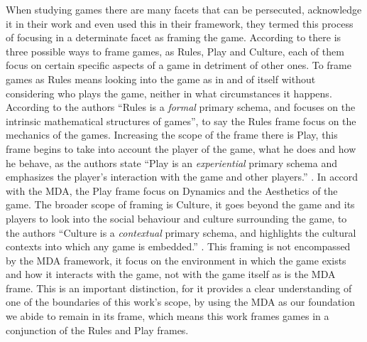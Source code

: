 When studying games there are many facets that can be persecuted, \cite{salen2004rules} acknowledge it in their work and even used this in their framework, they termed this process of focusing in a determinate facet as framing the game. According to \cite{salen2004rules} there is three possible ways to frame games, as Rules, Play and Culture, each of them focus on certain specific aspects of a game in detriment of other ones. To frame games as Rules means looking into the game as in and of itself without considering who plays the game, neither in what circumstances it happens. According to the authors ``Rules is a \textit{formal} primary schema, and focuses on the intrinsic mathematical structures of games''\cite{salen2004rules}, to say the Rules frame focus on the mechanics of the games. Increasing the scope of the frame there is Play, this frame begins to take into account the player of the game, what he does and how he behave, as the authors state ``Play is an \textit{experiential} primary schema and emphasizes the player's interaction with the game and other players.'' \cite{salen2004rules}. In accord with the MDA, the Play frame focus on Dynamics and the Aesthetics of the game. The broader scope of framing is Culture, it goes beyond the game and its players to look into the social behaviour and culture surrounding the game, to the authors ``Culture is a \textit{contextual} primary schema, and highlights the cultural contexts into which any game is embedded.'' \cite{salen2004rules}. This framing is not encompassed by the MDA framework, it focus on the environment in which the game exists and how it interacts with the game, not with the game itself as is the MDA frame. This is an important distinction, for it provides a clear understanding of one of the boundaries of this work's scope, by using the MDA as our foundation we abide to remain in its frame, which means this work frames games in a conjunction of the Rules and Play frames.

